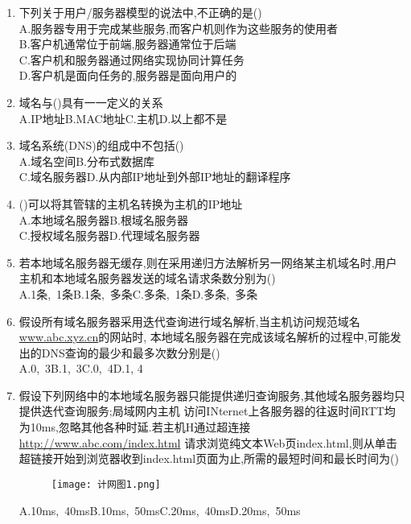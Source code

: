 \documentclass[12pt, a4paper, oneside, UTF8]{ctexbook}
\begin{document}
\begin{enumerate}
    \item 下列关于用户/服务器模型的说法中,不正确的是() \\
    A.服务器专用于完成某些服务,而客户机则作为这些服务的使用者 \\
    B.客户机通常位于前端,服务器通常位于后端 \\
    C.客户机和服务器通过网络实现协同计算任务 \\
    D.客户机是面向任务的,服务器是面向用户的

    \item 域名与()具有一一定义的关系 \\
    A.IP地址\qquad B.MAC地址\qquad C.主机\qquad D.以上都不是

    \item 域名系统(DNS)的组成中不包括() \\
    A.域名空间\qquad B.分布式数据库 \\
    C.域名服务器\qquad D.从内部IP地址到外部IP地址的翻译程序

    \item ()可以将其管辖的主机名转换为主机的IP地址 \\
    A.本地域名服务器\qquad B.根域名服务器 \\
    C.授权域名服务器\qquad D.代理域名服务器 

    \item 若本地域名服务器无缓存,则在采用递归方法解析另一网络某主机域名时,用户主机和本地域名服务器发送的域名请求条数分别为() \\
    A.1条,\ 1条\qquad B.1条,\ 多条\qquad C.多条,\ 1条\qquad D.多条,\ 多条

    \item 假设所有域名服务器采用迭代查询进行域名解析,当主机访问规范域名\underline{www.abc.xyz.cn}的网站时,
    本地域名服务器在完成该域名解析的过程中,可能发出的DNS查询的最少和最多次数分别是() \\
    A.0,\ 3\qquad B.1,\ 3\qquad C.0,\ 4\qquad D.1, 4

    \item 假设下列网络中的本地域名服务器只能提供递归查询服务,其他域名服务器均只提供迭代查询服务;局域网内主机
    访问INternet上各服务器的往返时间RTT均为10ms,忽略其他各种时延.若主机H通过超连接\underline{http://www.abc.com/index.html}
    请求浏览纯文本Web页index.html,则从单击超链接开始到浏览器收到index.html页面为止,所需的最短时间和最长时间为()  \\
    \begin{figure}[htbp]
        \centering
        \texttt{[image: 计网图1.png]}
    \end{figure}
    A.10ms,\ 40ms\qquad B.10ms,\ 50ms\qquad C.20ms,\ 40ms\qquad D.20ms,\ 50ms


\end{enumerate}
\end{document}
